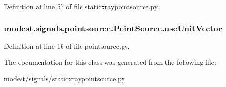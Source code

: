 Definition at line 57 of file staticxraypointsource.\+py.

\subsubsection[{\texorpdfstring{use\+Unit\+Vector}{useUnitVector}}]{\setlength{\rightskip}{0pt plus 5cm}modest.\+signals.\+pointsource.\+Point\+Source.\+use\+Unit\+Vector\hspace{0.3cm}{\ttfamily [inherited]}}\hypertarget{classmodest_1_1signals_1_1pointsource_1_1PointSource_ac2dd52c4e1f7e6264c9d59a5ffbc43d1}{}\label{classmodest_1_1signals_1_1pointsource_1_1PointSource_ac2dd52c4e1f7e6264c9d59a5ffbc43d1}


Definition at line 16 of file pointsource.\+py.



The documentation for this class was generated from the following file\+:\begin{DoxyCompactItemize}
\item 
modest/signals/\hyperlink{staticxraypointsource_8py}{staticxraypointsource.\+py}\end{DoxyCompactItemize}
